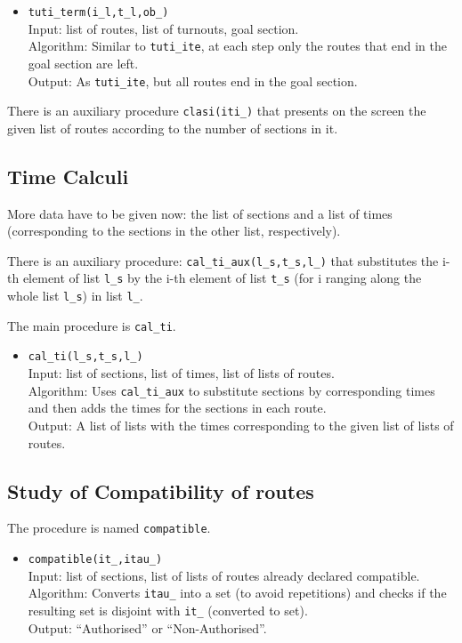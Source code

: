 \documentclass{article}
\begin{document}
\begin{itemize}
\item {\tt tuti\_term(i\_l,t\_l,ob\_)}  \\
      Input: list of routes, list of turnouts, goal section. \\
      Algorithm: Similar to {\tt tuti\_ite}, at each step only the routes that end 
                 in the goal section are left.    \\
      Output: As {\tt tuti\_ite}, but all routes end in the goal section. 
\end{itemize}
There is an auxiliary procedure {\tt clasi(iti\_)} that presents on the screen the given 
list of routes according to the number of sections in it.


\subsection{Time Calculi}

More data have to be given now: the list of sections and a list of times (corresponding 
to the sections in the other list, respectively).

There is an auxiliary procedure: {\tt cal\_ti\_aux(l\_s,t\_s,l\_)} that substitutes the 
i-th element of list {\tt l\_s} by the i-th element of list {\tt t\_s} (for i ranging along 
the whole list {\tt l\_s}) in list {\tt l\_}. 

The main procedure is {\tt cal\_ti}.
\begin{itemize}
\item {\tt cal\_ti(l\_s,t\_s,l\_)}  \\
      Input: list of sections, list of times, list of lists of routes. \\
      Algorithm: Uses {\tt cal\_ti\_aux} to substitute sections by corresponding times 
                 and then adds the times for the sections in each route. \\
      Output: A list of lists with the times corresponding to the given list of lists of 
              routes.
\end{itemize}



\subsection{Study of Compatibility of routes} 


The procedure is named {\tt compatible}.
\begin{itemize}
\item {\tt compatible(it\_,itau\_)}  \\
      Input: list of sections, list of lists of routes already declared 
             compatible.      \\
      Algorithm: Converts {\tt itau\_} into a set (to avoid repetitions) and checks if 
                 the resulting set is disjoint with {\tt it\_} (converted to set).  \\
      Output: ``Authorised'' or ``Non-Authorised''.
\end{itemize}
\end{document}
